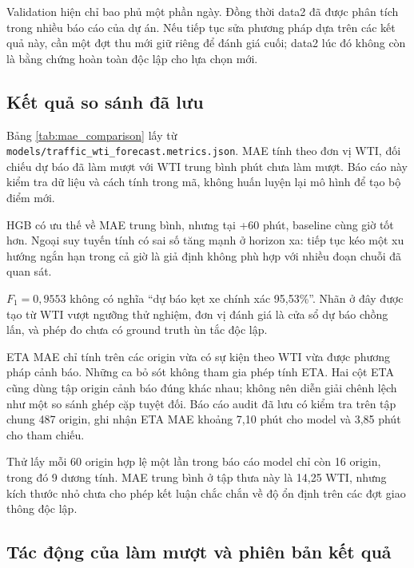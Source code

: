     Validation hiện chỉ bao phủ một phần ngày. Đồng thời data2 đã được phân tích trong nhiều báo cáo của dự án. Nếu tiếp tục sửa phương pháp dựa trên các kết quả này, cần một đợt thu mới giữ riêng để đánh giá cuối; data2 lúc đó không còn là bằng chứng hoàn toàn độc lập cho lựa chọn mới.

    \subsection{Kết quả so sánh đã lưu}
    Bảng \ref{tab:mae_comparison} lấy từ \texttt{models/traffic\_wti\_forecast.metrics.json}. MAE tính theo đơn vị WTI, đối chiếu dự báo đã làm mượt với WTI trung bình phút chưa làm mượt. Báo cáo này kiểm tra dữ liệu và cách tính trong mã, không huấn luyện lại mô hình để tạo bộ điểm mới.

    

    HGB có ưu thế về MAE trung bình, nhưng tại +60 phút, baseline cùng giờ tốt hơn. Ngoại suy tuyến tính có sai số tăng mạnh ở horizon xa: tiếp tục kéo một xu hướng ngắn hạn trong cả giờ là giả định không phù hợp với nhiều đoạn chuỗi đã quan sát.

    

    $F_1 = 0,9553$ không có nghĩa ``dự báo kẹt xe chính xác 95,53\%''. Nhãn ở đây được tạo từ WTI vượt ngưỡng thử nghiệm, đơn vị đánh giá là cửa sổ dự báo chồng lấn, và phép đo chưa có ground truth ùn tắc độc lập.

    ETA MAE chỉ tính trên các origin vừa có sự kiện theo WTI vừa được phương pháp cảnh báo. Những ca bỏ sót không tham gia phép tính ETA. Hai cột ETA cũng dùng tập origin cảnh báo đúng khác nhau; không nên diễn giải chênh lệch như một so sánh ghép cặp tuyệt đối. Báo cáo audit đã lưu có kiểm tra trên tập chung 487 origin, ghi nhận ETA MAE khoảng 7,10 phút cho model và 3,85 phút cho tham chiếu.

    Thử lấy mỗi 60 origin hợp lệ một lần trong báo cáo model chỉ còn 16 origin, trong đó 9 dương tính. MAE trung bình ở tập thưa này là 14,25 WTI, nhưng kích thước nhỏ chưa cho phép kết luận chắc chắn về độ ổn định trên các đợt giao thông độc lập.

    \subsection{Tác động của làm mượt và phiên bản kết quả}

    

